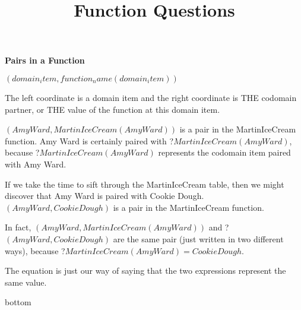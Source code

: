 \documentclass{ximera}
\title{Function Questions}
\begin{document}
\begin{abstract}
\end{abstract}

\maketitle





\textbf{Pairs in a Function} \\


\begin{center}
\textbf{$(domain_item, function_name(domain_item))$}
\end{center}

The left coordinate is a domain item and the right coordinate is THE codomain partner, or THE value of the function at this domain item.


\begin{example}
$(Amy Ward, MartinIceCream(Amy Ward))$ is a pair in the MartinIceCream function. Amy Ward is certainly paired with ?$MartinIceCream(Amy Ward)$, because ?$MartinIceCream(Amy Ward)$ represents the codomain item paired with Amy Ward.

If we take the time to sift through the MartinIceCream table, then we might discover that Amy Ward is paired with Cookie Dough.  $(Amy Ward, Cookie Dough)$ is a pair in the MartinIceCream function. 

In fact, $(Amy Ward, MartinIceCream(Amy Ward))$ and ?$(Amy Ward, Cookie Dough)$ are the same pair (just written in two different ways), because ?$MartinIceCream(Amy Ward) = Cookie Dough$.

The equation is just our way of saying that the two expressions represent the same value.        

\end{example}



bottom
\end{document}
